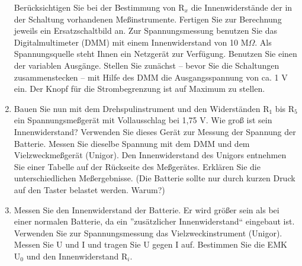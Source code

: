 \documentclass[12pt]{scrartcl}
\begin{document}
\begin{enumerate}
	Berücksichtigen Sie bei 	der Bestimmung 			von $\text{R}_x$ die Innenwiderstände 			der in der Schaltung vorhandenen 				Meßinstrumente. Fertigen Sie zur 				Berechnung jeweils ein Ersatzschaltbild 			an. Zur Spannungsmessung benutzen Sie 			das Digitalmultimeter (DMM) mit einem 			Innenwiderstand von 10 M$\Omega$. Als 			Spannungsquelle steht Ihnen ein 					Netzgerät zur Verfügung. Benutzen Sie 			einen der variablen Ausgänge. Stellen 			Sie zunächst -- bevor Sie die 					Schaltungen 	zusammenstecken -- mit Hilfe 	des DMM die Ausgangsspannung von ca. 			1 V ein. Der Knopf für die 						Strombegrenzung ist auf Maximum zu 				stellen.
	\item
	Bauen Sie nun mit dem Drehspulinstrument 	und den Widerständen $\text{R}_1$ bis 			$\text{R}_5$ ein Spannungsmeßgerät mit 			Vollausschlag bei 1,75 V. Wie groß ist 			sein Innenwiderstand? Verwenden Sie 				dieses Gerät zur Messung der Spannung 			der Batterie. Messen Sie dieselbe 				Spannung mit dem DMM und dem 					Vielzweckmeßgerät (Unigor). Den 					Innenwiderstand des Unigors entnehmen 			Sie einer Tabelle auf der Rückseite des 			Meßgerätes. Erklären Sie die 					unterschiedlichen Meßergebnisse.
	(Die Batterie sollte nur durch 					kurzen Druck auf den Taster belastet 			werden. Warum?)
	
	\item
	Messen Sie den Innenwiderstand der 				Batterie. Er wird größer sein als bei 			einer normalen Batterie, da ein 					”zusätzlicher Innenwiderstand“ eingebaut 	ist. Verwenden Sie zur Spannungsmessung 			das Vielzweckinstrument (Unigor). Messen 	Sie U und I und tragen Sie U gegen I 			auf. Bestimmen Sie die EMK $\text{U}_0$ und 		den Innenwiderstand $\text{R}_i$.
	

\end{enumerate}
\end{document}
